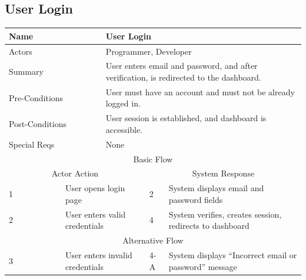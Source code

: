 \documentclass{FastFyp}
\begin{document}
\subsection{User Login}
\noindent
\begin{minipage}{\textwidth}
\centering
{}
\label{tab:login}
\begin{tabular}{|p{}|p{}|p{}|p{}|p{}|}
\hline
\multicolumn{2}{|p{0.15\textwidth}|}{Name} &
  \multicolumn{3}{p{0.75\textwidth}|}{User Login} \\ \hline
\multicolumn{2}{|p{0.15\textwidth}|}{Actors} &
  \multicolumn{3}{p{0.75\textwidth}|}{Programmer, Developer} \\ \hline
\multicolumn{2}{|p{0.15\textwidth}|}{Summary} &
  \multicolumn{3}{p{0.75\textwidth}|}{User enters email and password, and after verification, is redirected to the dashboard.} \\ \hline
\multicolumn{2}{|p{0.15\textwidth}|}{Pre-Conditions} &
  \multicolumn{3}{p{0.75\textwidth}|}{User must have an account and must not be already logged in.} \\ \hline
\multicolumn{2}{|p{0.15\textwidth}|}{Post-Conditions} &
  \multicolumn{3}{p{0.75\textwidth}|}{User session is established, and dashboard is accessible.} \\ \hline
\multicolumn{2}{|p{0.15\textwidth}|}{Special Reqs} &
  \multicolumn{3}{p{0.75\textwidth}|}{None} \\ \hline
\multicolumn{5}{|c|}{Basic Flow} \\ \hline
\multicolumn{3}{|c|}{Actor Action} &
  \multicolumn{2}{c|}{System Response} \\ \hline
1 &
  \multicolumn{2}{p{0.42\textwidth}|}{User opens login page} &
  2 &
  System displays email and password fields \\ \hline
2 &
  \multicolumn{2}{p{0.42\textwidth}|}{User enters valid credentials} &
  4 &
  System verifies, creates session, redirects to dashboard \\ \hline
\multicolumn{5}{|c|}{Alternative Flow} \\ \hline
3 &
  \multicolumn{2}{p{0.42\textwidth}|}{User enters invalid credentials} &
  4-A &
  System displays “Incorrect email or password” message \\ \hline
\end{tabular}
\end{minipage}
\end{document}

